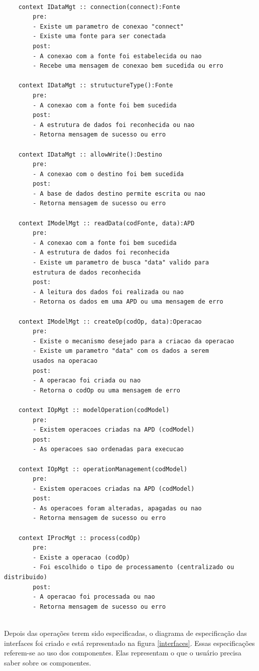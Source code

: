 \begin{lstlisting}[frame=single, language=Oberon-2, basicstyle=\tiny]

	context IDataMgt :: connection(connect):Fonte
		pre:
		- Existe um parametro de conexao "connect"
		- Existe uma fonte para ser conectada
		post:
		- A conexao com a fonte foi estabelecida ou nao
		- Recebe uma mensagem de conexao bem sucedida ou erro

	context IDataMgt :: strutuctureType():Fonte
		pre:
		- A conexao com a fonte foi bem sucedida
		post:
		- A estrutura de dados foi reconhecida ou nao
		- Retorna mensagem de sucesso ou erro
		
	context IDataMgt :: allowWrite():Destino
		pre:
		- A conexao com o destino foi bem sucedida
		post:
		- A base de dados destino permite escrita ou nao
		- Retorna mensagem de sucesso ou erro
	
	context IModelMgt :: readData(codFonte, data):APD
		pre:
		- A conexao com a fonte foi bem sucedida
		- A estrutura de dados foi reconhecida
		- Existe um parametro de busca "data" valido para 
		estrutura de dados reconhecida
		post:
		- A leitura dos dados foi realizada ou nao
		- Retorna os dados em uma APD ou uma mensagem de erro
		
	context IModelMgt :: createOp(codOp, data):Operacao
		pre:
		- Existe o mecanismo desejado para a criacao da operacao
		- Existe um parametro "data" com os dados a serem 
		usados na operacao
		post:
		- A operacao foi criada ou nao
		- Retorna o codOp ou uma mensagem de erro
		
	context IOpMgt :: modelOperation(codModel)
		pre:
		- Existem operacoes criadas na APD (codModel)
		post:
		- As operacoes sao ordenadas para execucao
		
	context IOpMgt :: operationManagement(codModel)
		pre:
		- Existem operacoes criadas na APD (codModel)
		post:
		- As operacoes foram alteradas, apagadas ou nao
		- Retorna mensagem de sucesso ou erro
	
	context IProcMgt :: process(codOp)
		pre:
		- Existe a operacao (codOp)
		- Foi escolhido o tipo de processamento (centralizado ou distribuido)
		post:
		- A operacao foi processada ou nao
		- Retorna mensagem de sucesso ou erro
		
\end{lstlisting}

Depois das operações terem sido especificadas, o diagrama de especificação das interfaces foi criado e está representado na figura \ref{interfaces}. Essas especificações referem-se ao uso dos componentes. Elas representam o que o usuário precisa saber sobre os componentes.

